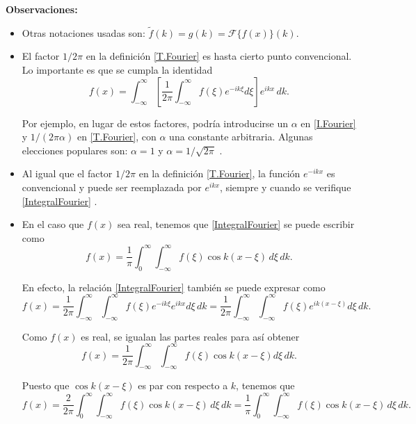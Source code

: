 \textbf{Observaciones:}
\begin{itemize}
    \item Otras notaciones usadas son: $\tilde{f}(k) = g(k) = \mathcal{F}\{f(x)\}(k)$.
    
    \item El factor $1/2\pi$ en la definición \eqref{T.Fourier} es hasta cierto punto convencional. Lo importante es que se cumpla la identidad
    \begin{equation}
        f(x) = \int_{-\infty}^{\infty} \left[\frac{1}{2\pi} \int_{-\infty}^{\infty} f(\xi) e^{-ik\xi} d\xi \right] e^{ikx} \,dk.
      \label{IntegralFourier}
    \end{equation}
   
    Por ejemplo, en lugar de estos factores, podría introducirse un $\alpha$ en \eqref{I.Fourier} y $1/(2\pi \alpha)$ en \eqref{T.Fourier}, con $\alpha$ una constante arbitraria. Algunas elecciones populares son: $\alpha = 1$ y $\alpha = 1/\sqrt{2\pi}$ \cite{Rubilar}.

    \item Al igual que el factor $1/2\pi$ en la definición \eqref{T.Fourier}, la función $e^{-ikx}$ es convencional y puede ser reemplazada por $e^{ikx}$, siempre y cuando se verifique \eqref{IntegralFourier} \cite{Butkov, Riley}.
    
    \item En el caso que $f(x)$ sea real, tenemos que \eqref{IntegralFourier} se puede escribir como 
    \begin{equation}
        f(x) = \frac{1}{\pi} \int_{0}^{\infty} \int_{-\infty}^{\infty} f(\xi) \cos k(x-\xi)  \, d\xi \,dk.  \label{IntegralFourierReal}
    \end{equation}

    \begin{shaded}
    En efecto, la relación \eqref{IntegralFourier} también se puede expresar como 
    $$f(x) = \frac{1}{2\pi}  \int_{-\infty}^{\infty} \int_{-\infty}^{\infty} f(\xi) e^{-ik\xi} e^{ikx} d\xi  \,dk = \frac{1}{2\pi}  \int_{-\infty}^{\infty} \int_{-\infty}^{\infty} f(\xi) e^{ik(x-\xi)} d\xi  \,dk.$$
    
    Como $f(x)$ es real, se igualan las partes reales para así obtener
    $$f(x) = \frac{1}{2\pi} \int_{-\infty}^{\infty} \int_{-\infty}^{\infty} f(\xi) \cos k(x-\xi) d\xi  \,dk. $$
    
    Puesto que $\cos k(x-\xi)$ es par con respecto a $k$, tenemos que 
    $$f(x) = \frac{2}{2\pi} \int_{0}^{\infty} \int_{-\infty}^{\infty} f(\xi) \cos k(x-\xi)  \, d\xi \,dk =\frac{1}{\pi} \int_{0}^{\infty} \int_{-\infty}^{\infty} f(\xi) \cos k(x-\xi)  \, d\xi \,dk. $$  
    \end{shaded}
    

\end{itemize}
